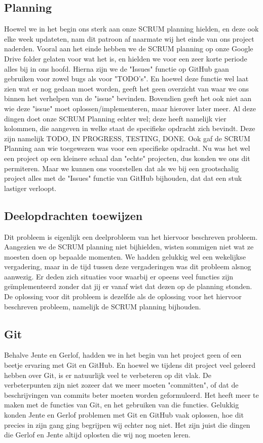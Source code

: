 \documentclass[a4paper,11pt]{article}
\begin{document}
\subsection{Planning}
Hoewel we in het begin ons sterk aan onze SCRUM planning hielden, en deze ook elke week updateten, nam dit patroon af naarmate wij het einde van ons project naderden. Vooral aan het einde hebben we de
SCRUM planning op onze Google Drive folder gelaten voor wat het is, en hielden we voor een zeer korte periode alles bij in ons hoofd. Hierna zijn we de "Issues" functie op GitHub gaan gebruiken voor zowel 
bugs als voor "TODO's". 
En hoewel deze functie wel laat zien wat er nog gedaan moet worden, geeft het geen overzicht van waar we ons binnen het verhelpen van de "issue" bevinden. Bovendien geeft het ook niet aan wie 
deze "issue" moet oplossen/implementeren, maar hierover later meer.
Al deze dingen doet onze SCRUM Planning echter wel; deze heeft namelijk vier kolommen, die aangeven in welke staat de specifieke opdracht zich bevindt. Deze zijn namelijk TODO, IN PROGRESS, TESTING, DONE.
Ook gaf de SCRUM Planning aan wie toegewezen was voor een specifieke opdracht.
Nu was het wel een project op een kleinere schaal dan "echte" projecten, dus konden we ons dit permiteren. Maar we kunnen ons voorstellen dat als we bij een grootschalig project alles met de "Issues"
functie van GitHub bijhouden, dat dat een stuk lastiger verloopt. 

\subsection{Deelopdrachten toewijzen}
Dit probleem is eigenlijk een deelprobleem van het hiervoor beschreven probleem. Aangezien we de SCRUM planning niet bijhielden, wisten sommigen niet wat ze moesten doen op bepaalde momenten. We hadden 
gelukkig wel een wekelijkse vergadering, maar in de tijd tussen deze vergaderingen was dit probleem alsnog aanwezig. Er deden zich situaties voor waarbij er opeens veel functies zijn ge\"{i}mplementeerd
zonder dat jij er vanaf wist dat dezen op de planning stonden. De oplossing voor dit probleem is dezelfde als de oplossing voor het hiervoor beschreven probleem, namelijk de SCRUM planning bijhouden.

\subsection{Git}
Behalve Jente en Gerlof, hadden we in het begin van het project geen of een beetje ervaring met Git en GitHub. En hoewel we tijdens dit project veel geleerd hebben over Git, is er natuurlijk veel te 
verbeteren op dit vlak. De verbeterpunten zijn niet zozeer dat we meer moeten "committen", of dat de beschrijvingen van commits beter moeten worden geformuleerd. Het heeft meer te maken met de functies
van Git, en het gebruiken van die functies. Gelukkig konden Jente en Gerlof problemen met Git en GitHub vaak oplossen, hoe dit precies in zijn gang ging begrijpen wij echter nog niet. Het zijn juist die
dingen die Gerlof en Jente altijd oplosten die wij nog moeten leren. 
\end{document}
